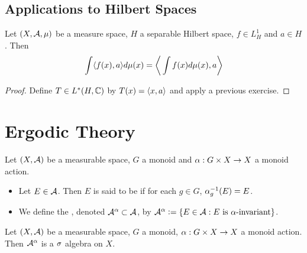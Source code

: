 \documentclass{book}
\begin{document}
	
	
	
	
	
	
	
	
	
	
	
	
	\newpage
	\section{Applications to Hilbert Spaces}	
	
	\begin{ex}  
	Let $(X, \mathcal{A}, \mu)$ be a measure space, $H$ a separable Hilbert space, $f \in L^1_H$ and $a \in H$. Then $$\int \langle f(x), a \rangle d\mu(x) = \bigg \langle \int f(x) d \mu(x) , a\bigg \rangle$$ 
	\end{ex}	
	
	\begin{proof}
	Define $T \in L^*(H, \mathbb{C})$ by $T(x) = \langle x, a \rangle$ and apply a previous exercise.
	\end{proof}
	
	
	
	
	
	
	
	
	
	
	
	
	
	
	
	
	
	
	
	
	
	
	
	
	
	
	
	\chapter{Ergodic Theory}
	
	\begin{defn}
		Let $(X, \mathcal{A})$ be a measurable space, $G$ a monoid and $\alpha:G \times X \rightarrow X$ a monoid action. 
		\begin{itemize}
			\item Let $E \in \mathcal{A}$. Then $E$ is said to be  if for each $g \in G$, $\alpha_g^{-1}(E) = E$.
			\item We define the , denoted $\mathcal{A}^{\alpha} \subset \mathcal{A}$, by $\mathcal{A}^{\alpha} \vcentcolon= \{E \in \mathcal{A}: \text{$E$ is $\alpha$-invariant}\}$.
		\end{itemize}
	\end{defn}
	
	\begin{ex}
		Let $(X, \mathcal{A})$ be a measurable space, $G$ a monoid, $\alpha:G \times X \rightarrow X$ a monoid action. Then $\mathcal{A}^{\alpha}$ is a $\sigma$ algebra on $X$. 
	\end{ex}
	
\end{document}
